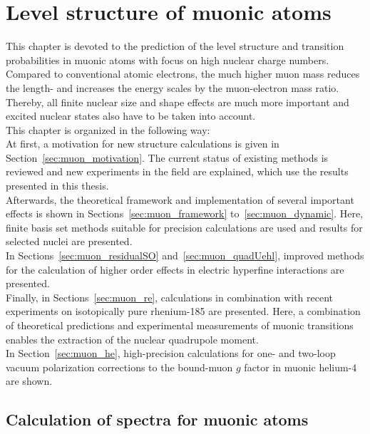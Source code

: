 \chapter{Level structure of muonic atoms}
\label{ch:muonic_atoms}
This chapter is devoted to the prediction of the level structure and transition probabilities in muonic atoms with focus on high nuclear charge numbers. Compared to conventional atomic electrons, the much higher muon mass reduces the length- and  increases the energy scales by the muon-electron mass ratio. Thereby, all finite nuclear size and shape effects are much more important and excited nuclear states also have to be taken into account.\\
This chapter is organized in the following way:\\
At first, a motivation for new structure calculations is given in Section~\ref{sec:muon_motivation}. The current status of existing methods is reviewed and new experiments in the field are explained, which use the results presented in this thesis.\\
Afterwards, the theoretical framework and implementation of several important effects is shown in Sections~\ref{sec:muon_framework} to~\ref{sec:muon_dynamic}. Here, finite basis set methods suitable for precision calculations are used and results for selected nuclei are presented.\\
In Sections~\ref{sec:muon_residualSO} and~\ref{sec:muon_quadUehl}, improved methods for the calculation of higher order effects in electric hyperfine interactions are presented.\\
Finally, in Sections~\ref{sec:muon_re}, calculations in combination with recent experiments on isotopically pure rhenium-185 are presented. Here, a combination of theoretical predictions and experimental measurements of muonic transitions enables the extraction of the nuclear quadrupole moment. \\
In Section~\ref{sec:muon_he}, high-precision calculations for one- and two-loop vacuum polarization corrections to the bound-muon $g$ factor in muonic helium-4 are shown.

\section{Calculation of spectra for muonic atoms}
\label{sec:calculationSpectraMuon}
